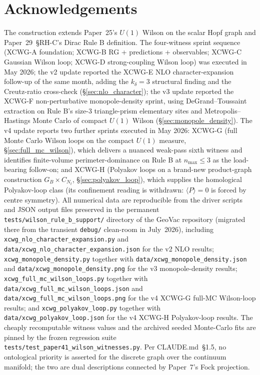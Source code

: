 \documentclass[11pt]{article}
\begin{document}
\section*{Acknowledgements}

The construction extends Paper~25's $U(1)$ Wilson on the scalar Hopf graph
and Paper~29~\S{}RH-C's Dirac Rule B definition. The four-witness sprint
sequence (XCWG-A foundation; XCWG-B RG + predictions + observables;
XCWG-C Gaussian Wilson loop; XCWG-D strong-coupling Wilson loop) was
executed in May 2026; the v2 update reported the XCWG-E NLO character-expansion
follow-up of the same month, adding the $k_\delta=3$ structural finding
and the Creutz-ratio cross-check (\S\ref{sec:nlo_character}); the v3 update
reported the XCWG-F non-perturbative monopole-density sprint, using
DeGrand--Toussaint extraction on Rule B's size-3 triangle-prism elementary
sites and Metropolis--Hastings Monte Carlo of compact $U(1)$ Wilson
(\S\ref{sec:monopole_density}). The v4 update reports two further
sprints executed in May 2026: XCWG-G (full Monte Carlo Wilson loops on the
compact $U(1)$ measure, \S\ref{sec:full_mc_wilson}), which delivers a
nuanced weak-pass sixth witness and identifies finite-volume
perimeter-dominance on Rule B at $n_\text{max}\le 3$ as the load-bearing
follow-on; and XCWG-H (Polyakov loops on a brand-new product-graph
construction $G_B\times C_{N_t}$, \S\ref{sec:polyakov_loop}), which supplies
the homological Polyakov-loop class (its confinement reading is withdrawn:
$\langle P\rangle = 0$ is forced by centre symmetry). All numerical data
are reproducible from the driver scripts and JSON output files preserved
in the permanent \texttt{tests/wilson\_rule\_b\_support/} directory of the
GeoVac repository (migrated there from the transient \texttt{debug/}
clean-room in July~2026), including
\texttt{xcwg\_nlo\_character\_expansion.py} and
\texttt{data/xcwg\_nlo\_character\_expansion.json} for the v2 NLO
results; \texttt{xcwg\_monopole\_density.py} together with
\texttt{data/xcwg\_monopole\_density.json} and
\texttt{data/xcwg\_monopole\_density.png} for the v3 monopole-density
results; \texttt{xcwg\_full\_mc\_wilson\_loops.py} together with
\texttt{data/xcwg\_full\_mc\_wilson\_loops.json} and
\texttt{data/xcwg\_full\_mc\_wilson\_loops.png} for the v4 XCWG-G
full-MC Wilson-loop results; and \texttt{xcwg\_polyakov\_loop.py}
together with \texttt{data/xcwg\_polyakov\_loop.json} for the v4
XCWG-H Polyakov-loop results. The cheaply recomputable witness values and
the archived seeded Monte-Carlo fits are pinned by the frozen regression
suite \texttt{tests/test\_paper41\_wilson\_witnesses.py}. Per
CLAUDE.md~\S 1.5, no ontological
priority is asserted for the discrete graph over the continuum manifold;
the two are dual descriptions connected by Paper~7's Fock projection.
\end{document}
